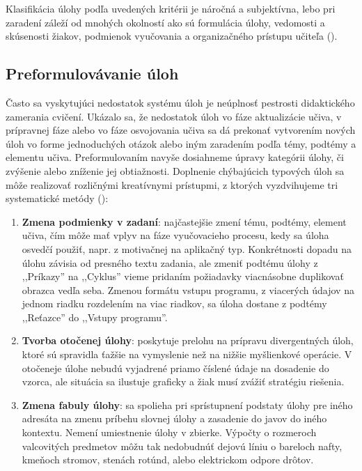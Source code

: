 Klasifikácia úlohy podľa uvedených kritérii je náročná a subjektívna, lebo pri zaradení záleží od mnohých okolností ako sú formulácia úlohy, vedomosti a skúsenosti žiakov, podmienok vyučovania a organizačného prístupu učiteľa (\cite{mindakova_tvorba_2008}). 

\subsection{Preformulovávanie úloh}
Často sa vyskytujúci nedostatok systému úloh je neúplnosť pestrosti didaktického zamerania cvičení. Ukázalo sa, že nedostatok úloh vo fáze aktualizácie učiva, v prípravnej fáze alebo vo fáze osvojovania učiva sa dá prekonať vytvorením nových úloh vo forme jednoduchých otázok alebo iným zaradením podľa témy, podtémy a elementu učiva. Preformulovaním navyše dosiahneme úpravy kategórii úlohy, či zvýšenie alebo zníženie jej obtiažnosti. Doplnenie chýbajúcich typových úloh sa môže realizovať rozličnými kreatívnymi prístupmi, z ktorých vyzdvihujeme tri systematické metódy (\cite{mindakova_tvorba_2008}):

\begin{enumerate}[label=\alph*),noitemsep,topsep=0pt]
\item \textbf{Zmena podmienky v zadaní}: najčastejšie zmení tému, podtémy, element učiva, čím môže mať vplyv na fáze vyučovacieho procesu, kedy sa úloha osvedčí použiť, napr. z motivačnej na aplikačný typ. Konkrétnosti dopadu na úlohu závisia od presného textu zadania, ale zmeniť podtému úlohy z ,,Príkazy'' na ,,Cyklus'' vieme pridaním požiadavky viacnásobne duplikovať obrazca vedľa seba. Zmenou formátu vstupu programu, z viacerých údajov na jednom riadku rozdelením na viac riadkov, sa úloha dostane z podtémy ,,Reťazce'' do ,,Vstupy programu''.
\item \textbf{Tvorba otočenej úlohy}: poskytuje prelohu na prípravu divergentných úloh, ktoré sú spravidla ťažšie na vymyslenie než na nižšie myšlienkové operácie. V otočeneje úlohe nebudú vyjadrené priamo číslené údaje na dosadenie do vzorca, ale situácia sa ilustuje  graficky a žiak musí zvážiť stratégiu riešenia.
\item \textbf{Zmena fabuly úlohy}: sa spolieha pri sprístupnení podstaty úlohy pre iného adresáta na zmenu príbehu slovnej úlohy a zasadenie do javov do iného kontextu. Nemení umiestnenie úlohy v zbierke. Výpočty o rozmeroch valcovitých predmetov môžu tak nedobudnúť dejovú líniu o bareloch nafty, kmeňoch stromov, stenách rotúnd, alebo elektrickom odpore drôtov.
\end{enumerate}


